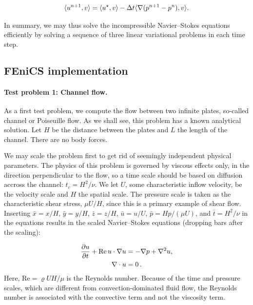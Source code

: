 \documentclass[graybox,envcountchap,sectrefs,final]{svmonodo}
\begin{document}
\begin{equation}
\label{ftut1:ipcs3}
  \langle {u^{n+1}},{v} \rangle
  =
  \langle {u^{\star}},{v} \rangle
  - \dt \langle {\nabla(p^{n+1}-p^{n})},{v} \rangle.
\end{equation}

In summary, we may thus solve the incompressible Navier--Stokes
equations efficiently by solving a sequence of three linear variational
problems in each time step.




\subsection{FEniCS implementation}

\paragraph{Test problem 1: Channel flow.}

As a first test problem, we compute the flow between two infinite
plates, so-called channel or Poiseuille flow. As we shall see, this
problem has a known analytical solution. Let $H$ be the distance
between the plates and $L$ the length of the channel. There are no
body forces.


We may scale the problem first to get rid of seemingly independent
physical parameters. The physics of this problem is governed by
viscous effects only, in the direction perpendicular to the flow, so a
time scale should be based on diffusion accross the channel: $t_c =
H^2/\nu$. We let $U$, some characteristic inflow velocity, be the
velocity scale and $H$ the spatial scale. The pressure scale is taken
as the characteristic shear stress, $\mu U/H$, since this is a primary
example of shear flow.  Inserting $\bar x = x/H$, $\bar y = y/H$,
$\bar z = z/H$, $\bar u =u/U$, $\bar p = Hp/(\mu U)$, and $\bar t =
H^2/\nu$ in the equations results in the scaled Navier--Stokes
equations (dropping bars after the scaling):


\begin{align*}
\frac{\partial u}{\partial t} + \mathrm{Re}\, u\cdot\nabla u
&= -\nabla p + \nabla^2 u,\\
\nabla\cdot u &= 0\tp
\end{align*}
Here, $\mathrm{Re} = \varrho UH/\mu$ is the Reynolds number. Because
of the time and pressure scales, which are different from
convection-dominated fluid flow, the Reynolds number is associated
with the convective term and not the viscosity term.
\end{document}
